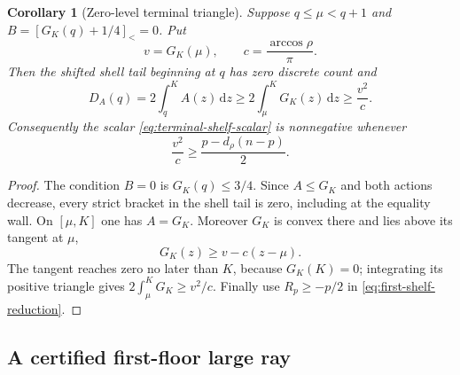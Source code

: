 \documentclass[11pt]{article}
\newtheorem{corollary}[theorem]{Corollary}
\theoremstyle{remark}
\newcommand{\sbr}[1]{[#1]_{<}}
\newcommand{\dd}{\,\mathrm d}
\begin{document}
\begin{corollary}[Zero-level terminal triangle]
\label{cor:zero-level-terminal-triangle}
Suppose $q\leq\mu<q+1$ and
$B=\sbr{G_K(q)+1/4}=0$.  Put
\[
 v=G_K(\mu),\qquad c=\frac{\arccos\rho}{\pi}.
\]
Then the shifted shell tail beginning at $q$ has zero discrete count and
\begin{equation}
 \boxed{
 D_A(q)=2\int_q^K A(z)\dd z
 \geq2\int_\mu^KG_K(z)\dd z
 \geq\frac{v^2}{c}.}
 \label{eq:zero-level-terminal-triangle}
\end{equation}
Consequently the scalar \eqref{eq:terminal-shelf-scalar} is nonnegative
whenever
\begin{equation}
 \frac{v^2}{c}\geq\frac{p-d_\rho(n-p)}2.
 \label{eq:zero-level-shelf-payment}
\end{equation}
\end{corollary}

\begin{proof}
The condition $B=0$ is $G_K(q)\leq3/4$.  Since $A\leq G_K$ and both
actions decrease, every strict bracket in the shell tail is zero, including
at the equality wall.  On $[\mu,K]$ one has $A=G_K$.  Moreover $G_K$ is
convex there and lies above its tangent at $\mu$,
\[
 G_K(z)\geq v-c(z-\mu).
\]
The tangent reaches zero no later than $K$, because $G_K(K)=0$; integrating
its positive triangle gives $2\int_\mu^KG_K\geq v^2/c$.  Finally use
$R_p\geq-p/2$ in \eqref{eq:first-shelf-reduction}.
\end{proof}

\subsection{A certified first-floor large ray}
\end{document}
